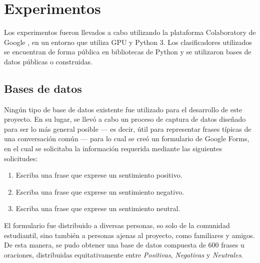 \documentclass[conference]{IEEEtran}
\begin{document}


\section{Experimentos} \label{sec:experimentos}

    Los experimentos fueron llevados a cabo utilizando la plataforma Colaboratory de Google \cite{colaboratory}, en un entorno que utiliza GPU y Python 3. Los clasificadores utilizados se encuentran de forma pública en bibliotecas de Python y se utilizaron bases de datos públicas o construidas.
    
    
    \subsection{Bases de datos}
    
        Ningún tipo de base de datos existente fue utilizado para el desarrollo de este proyecto. En su lugar, se llevó a cabo un proceso de captura de datos diseñado para ser lo más general posible --- es decir, útil para representar frases típicas de una conversación común --- para lo cual se creó un formulario de Google Forms, en el cual se solicitaba la información requerida mediante las siguientes solicitudes:
        
        \begin{enumerate}
            \item Escriba una frase que exprese un sentimiento positivo.
            
            \item Escriba una frase que exprese un sentimiento negativo.
            
            \item Escriba una frase que exprese un sentimiento neutral.
        \end{enumerate}
    
        El formulario fue distribuido a diversas personas, so solo de la comunidad estudiantil, sino también a personas ajenas al proyecto, como familiares y amigos. De esta manera, se pudo obtener una base de datos compuesta de 600 frases u oraciones, distribuidas equitativamente entre \textit{Positivas}, \textit{Negativas} y \textit{Neutrales}.
            
\end{document}
